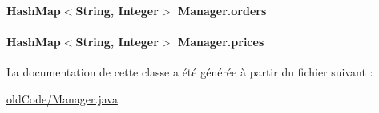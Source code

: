 \paragraph[{orders}]{\setlength{\rightskip}{0pt plus 5cm}Hash\+Map$<$String, Integer$>$ Manager.\+orders\hspace{0.3cm}{\ttfamily [private]}}\label{classManager_ab01a8b5bc2e4f1cc3abc9247bbf2ae6b}
\hypertarget{classManager_a4cb6296ce84b2fa63ff5726db1584238}{}
\paragraph[{prices}]{\setlength{\rightskip}{0pt plus 5cm}Hash\+Map$<$String, Integer$>$ Manager.\+prices\hspace{0.3cm}{\ttfamily [private]}}\label{classManager_a4cb6296ce84b2fa63ff5726db1584238}


La documentation de cette classe a été générée à partir du fichier suivant \+:\begin{DoxyCompactItemize}
\item 
\hyperlink{oldCode_2Manager_8java}{old\+Code/\+Manager.\+java}\end{DoxyCompactItemize}
